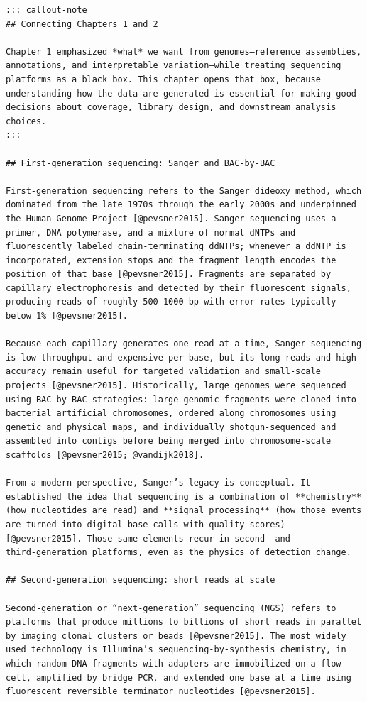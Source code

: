 \documentclass[
  letterpaper,
  DIV=11,
  numbers=noendperiod]{scrreprt}
\begin{document}
\begin{verbatim}
::: callout-note
## Connecting Chapters 1 and 2

Chapter 1 emphasized *what* we want from genomes—reference assemblies, annotations, and interpretable variation—while treating sequencing platforms as a black box. This chapter opens that box, because understanding how the data are generated is essential for making good decisions about coverage, library design, and downstream analysis choices.
:::

## First‑generation sequencing: Sanger and BAC‑by‑BAC

First‑generation sequencing refers to the Sanger dideoxy method, which dominated from the late 1970s through the early 2000s and underpinned the Human Genome Project [@pevsner2015]. Sanger sequencing uses a primer, DNA polymerase, and a mixture of normal dNTPs and fluorescently labeled chain‑terminating ddNTPs; whenever a ddNTP is incorporated, extension stops and the fragment length encodes the position of that base [@pevsner2015]. Fragments are separated by capillary electrophoresis and detected by their fluorescent signals, producing reads of roughly 500–1000 bp with error rates typically below 1% [@pevsner2015].

Because each capillary generates one read at a time, Sanger sequencing is low throughput and expensive per base, but its long reads and high accuracy remain useful for targeted validation and small‑scale projects [@pevsner2015]. Historically, large genomes were sequenced using BAC‑by‑BAC strategies: large genomic fragments were cloned into bacterial artificial chromosomes, ordered along chromosomes using genetic and physical maps, and individually shotgun‑sequenced and assembled into contigs before being merged into chromosome‑scale scaffolds [@pevsner2015; @vandijk2018].

From a modern perspective, Sanger’s legacy is conceptual. It established the idea that sequencing is a combination of **chemistry** (how nucleotides are read) and **signal processing** (how those events are turned into digital base calls with quality scores) [@pevsner2015]. Those same elements recur in second‑ and third‑generation platforms, even as the physics of detection change.

## Second‑generation sequencing: short reads at scale

Second‑generation or “next‑generation” sequencing (NGS) refers to platforms that produce millions to billions of short reads in parallel by imaging clonal clusters or beads [@pevsner2015]. The most widely used technology is Illumina’s sequencing‑by‑synthesis chemistry, in which random DNA fragments with adapters are immobilized on a flow cell, amplified by bridge PCR, and extended one base at a time using fluorescent reversible terminator nucleotides [@pevsner2015].


\end{verbatim}
\end{document}
